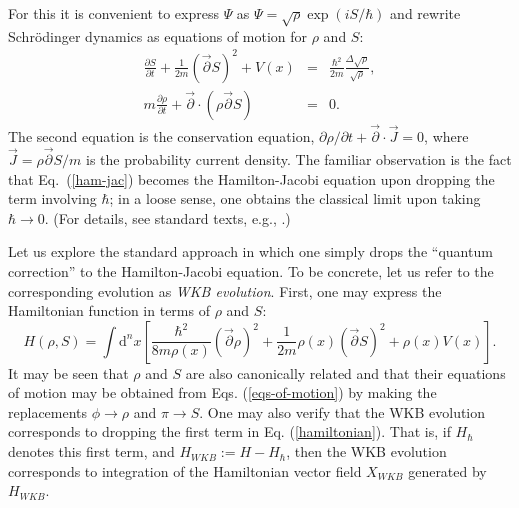 \documentclass[12pt,aps,eqsecnum,tighten]{revtex4-2}
\def\be{\begin{equation}}
\def\ee{\end{equation}}
\def\ba{\begin{eqnarray}}
\def\ea{\end{eqnarray}}
\def\d{{\mathrm d}}
\def\i{{i}}
\newcommand{\eqn}[1]{Eq.~(\ref{#1})}
\begin{document}
For this it is convenient to express $\Psi$ as $\Psi =
\sqrt{\rho}\exp( \i S/\hbar )$ and rewrite Schr\"odinger dynamics as
equations of motion for $\rho$ and $S$:
%
\ba\label{ham-jac}
\frac{\partial S}{\partial t} + \frac{1}{2m}(\vec{\partial}S)^2
+ V(x)&=& \frac{\hbar^2}{2m} \frac{\Delta \sqrt{\rho}}
{\sqrt{\rho}},\\
%
m\frac{\partial \rho}{\partial t} + \vec{\partial} \cdot
(\rho \vec{\partial} S) &=& 0.
\ea
%
The second equation is the conservation equation, $\partial \rho /
\partial t + \vec{\partial}\cdot \vec{J} = 0$, where $\vec{J} =
\rho\vec{\partial}S/m$ is the probability current density.  The
familiar observation is the fact that \eqn{ham-jac} becomes the
Hamilton-Jacobi equation upon dropping the term involving $\hbar$; in
a loose sense, one obtains the classical limit upon taking $\hbar
\rightarrow 0$. (For details, see standard texts, e.g.,
\cite{goldstein,lanczos}.)

Let us explore the standard approach in which one simply drops the
``quantum correction'' to the Hamilton-Jacobi equation.  To be
concrete, let us refer to the corresponding evolution
as {\it WKB evolution}.  First, one may
express the Hamiltonian function in terms of $\rho$ and $S$:
%
\be \label{hamiltonian}
H(\rho, S) = \int \d^n\!x \left[ \frac{\hbar^2}{8m\rho(x)}
(\vec{\partial}\rho)^2
+ \frac{1}{2m}\rho(x) (\vec{\partial} S)^2 + \rho(x)V(x)\right].
\ee
%
It may be seen that $\rho$ and $S$ are also canonically related and
that their equations of motion may be obtained from
Eqs. (\ref{eqs-of-motion}) by making the replacements $\phi
\rightarrow \rho$ and $\pi \rightarrow S$.  One may also verify that
the WKB evolution corresponds to dropping the first term in
Eq. (\ref{hamiltonian}).  That is, if $H_\hbar$ denotes this first
term, and $H_{WKB} := H - H_\hbar$, then the WKB evolution corresponds
to integration of the Hamiltonian vector field $X_{WKB}$ generated by
$H_{WKB}$.
\end{document}
